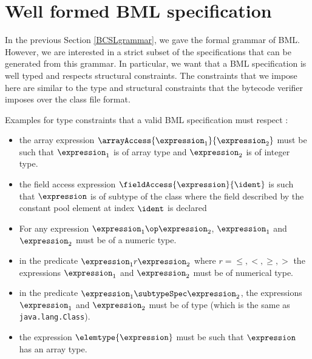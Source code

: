 
\newcommand{\getType}{\mbox{\rm\textsf{getType}}}
\newcommand{\constType}{\mbox{\rm\textsf{constType}}}
\newcommand{\getClass}{\mbox{\rm\textsf{getClass}}}
\newcommand{\application}{\mbox{\rm\textbf{CLS}}}
 
\section{Well formed BML specification}
In the previous Section \ref{BCSLgrammar}, we gave the formal grammar of BML.
However, we are interested in a strict subset of 
the specifications that can be generated from this grammar. In particular, we want that a
BML specification is well typed and respects structural constraints.
The constraints that we impose here are similar to the type and structural constraints
that the bytecode verifier imposes over the class file format.

Examples for type constraints that  a valid BML specification must respect : 
\begin{itemize}
    \item  the array expression $\arrayAccess{\expression_1}{\expression_2}$ must be such that 
$\expression_1$ is of array type and $\expression_2$  is of integer type.

    \item the field access expression  $\fieldAccess{\expression}{\ident}$ is such that $\expression$ is of subtype
    of the class where the field described by the constant pool element at index $\ident$ is declared
    \item For any expression $ \expression_1 \op \expression_2$,  $ \expression_1$ and $ \expression_2$ must be of
          a numeric type.
    
    \item in the predicate $\expression_1 r \expression_2$ where $r =  \leq,<,\geq, >$  the expressions  $\expression_1$ and 
          $\expression_2$ must be of numerical type.

     \item  in the predicate $\expression_1  \subtypeSpec \expression_2$, the expressions $\expression_1$
            and  $\expression_2$ must be of type \TYPE (which is the same as \texttt{java.lang.Class}).

     \item the expression $\elemtype{\expression}$ must be such that $\expression$ has an array type.
	    
     

	  
 \end{itemize}

